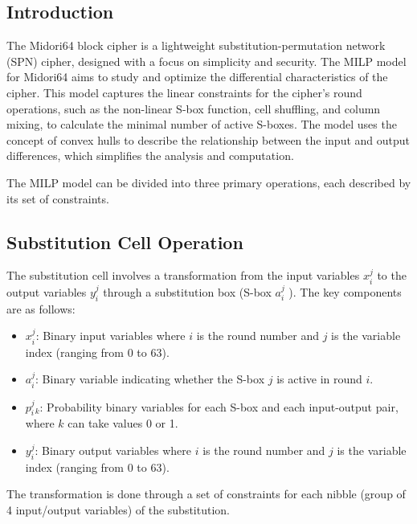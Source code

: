 \subsection*{Introduction}

The Midori64 block cipher is a lightweight substitution-permutation network
(SPN) cipher, designed with a focus on simplicity and security. The MILP model
for Midori64 aims to study and optimize the differential characteristics of the
cipher. This model captures the linear constraints for the cipher's round
operations, such as the non-linear S-box function, cell shuffling, and column
mixing, to calculate the minimal number of active S-boxes. The model uses the
concept of convex hulls to describe the relationship between the input and
output differences, which simplifies the analysis and computation.

The MILP model can be divided into three primary operations, each described by
its set of constraints.


\subsection{Substitution Cell Operation}

The substitution cell involves a transformation from the input variables \(
x_i^j \) to the output variables \( y_i^j \) through a substitution box (S-box  $a_i^j$ ).
The key components are as follows:

\begin{itemize}
    \item \( x_i^j \): Binary input variables where \( i \) is the round number
          and \( j \) is the variable index (ranging from 0 to 63).
    \item \( a_i^j \): Binary variable indicating whether the S-box \( j \) is
          active in round \( i \).
    \item \( p_i^j_k \): Probability binary variables for each S-box and each
          input-output pair, where \( k \) can take values 0 or 1.
    \item \( y_i^j \): Binary output variables where \( i \) is the round number and \( j \) is the variable index (ranging from 0 to 63).
\end{itemize}


The transformation is done through a set of constraints for each nibble (group
of 4 input/output variables) of the substitution.

